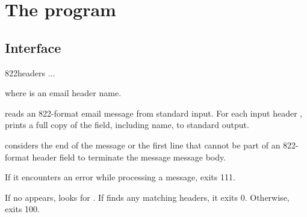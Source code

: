 
\chapter{The  program}

\section{Interface}
\begin{code}
  822headers  ...
\end{code}
where  is an email header name.

 reads an 822-format email message from standard input.
For each input header ,  prints a
full copy of the field, including name, to standard output.

 considers the end of the message or the first line that
cannot be part of an 822-format header field to terminate the message
message body.

If it encounters an error while processing a message,
 exits 111.

If no  appears,  looks for .
If  finds any matching headers, it exits 0.
Otherwise,  exits 100.

